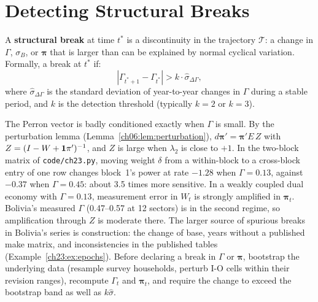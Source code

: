 \documentclass[../structural_economics_book.tex]{subfiles}
\begin{document}
\section{Detecting Structural Breaks}
\label{ch23:sec:breaks}

\begin{definition}\label{ch23:def:break}
A \textbf{structural break} at time $t^*$ is a discontinuity in the trajectory $\mathcal{T}$: a change in $\Gamma$, $\sigma_B$, or $\boldsymbol{\pi}$ that is larger than can be explained by normal cyclical variation. Formally, a break at $t^*$ if:
\begin{equation}\label{ch23:eq:break}
|\Gamma_{t^*+1} - \Gamma_{t^*}| > k \cdot \hat{\sigma}_{\Delta\Gamma},
\end{equation}
where $\hat{\sigma}_{\Delta\Gamma}$ is the standard deviation of year-to-year changes in $\Gamma$ during a stable period, and $k$ is the detection threshold (typically $k = 2$ or $k = 3$).
\end{definition}

\begin{remark}\label{ch23:rem:conditioning}
The Perron vector is badly conditioned exactly when $\Gamma$ is small. By the perturbation lemma (Lemma~\ref{ch06:lem:perturbation}), $d\boldsymbol{\pi}' = \boldsymbol{\pi}'E\,Z$ with $Z = (I - W + \mathbf{1}\pi')^{-1}$, and $Z$ is large when $\lambda_2$ is close to $+1$. In the two-block matrix of \texttt{code/ch23.py}, moving weight $\delta$ from a within-block to a cross-block entry of one row changes block~1's power at rate $-1.28$ when $\Gamma = 0.13$, against $-0.37$ when $\Gamma = 0.45$: about 3.5 times more sensitive. In a weakly coupled dual economy with $\Gamma = 0.13$, measurement error in $W_t$ is strongly amplified in $\boldsymbol{\pi}_t$. Bolivia's measured $\Gamma$ (0.47--0.57 at 12 sectors) is in the second regime, so amplification through $Z$ is moderate there. The larger source of spurious breaks in Bolivia's series is construction: the change of base, years without a published make matrix, and inconsistencies in the published tables (Example~\ref{ch23:ex:epochs}). Before declaring a break in $\Gamma$ or $\boldsymbol{\pi}$, bootstrap the underlying data (resample survey households, perturb I-O cells within their revision ranges), recompute $\Gamma_t$ and $\boldsymbol{\pi}_t$, and require the change to exceed the bootstrap band as well as $k\hat{\sigma}$.
\end{remark}
\end{document}
